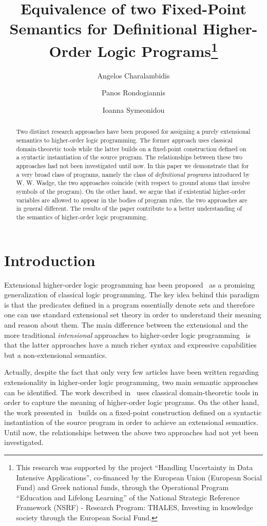 \documentclass[submission,copyright]{eptcs}
\title{Equivalence of two Fixed-Point Semantics for Definitional Higher-Order
Logic Programs\thanks{This research was supported by the project ``Handling Uncertainty in Data Intensive Applications'',
co-financed by the European Union (European Social Fund) and Greek national funds,
through the Operational Program ``Education and Lifelong Learning'' of the National
Strategic Reference Framework (NSRF) - Research Program: THALES, Investing in
knowledge society through the European Social Fund.}}
\author{Angelos Charalambidis
\institute{University of Athens \\ Athens, Greece}
\email{a.charalambidis@di.uoa.gr}
\and
Panos Rondogiannis
\institute{University of Athens \\ Athens, Greece}
\email{prondo@di.uoa.gr}
\and
Ioanna Symeonidou
\institute{University of Athens \\ Athens, Greece}
\email{i.symeonidou@di.uoa.gr}
}
\theoremstyle{definition}
\begin{document}
\maketitle

\begin{abstract}
Two distinct research approaches have been proposed for assigning a purely
  extensional semantics to higher-order logic programming. The former approach
  uses classical domain-theoretic tools while the latter builds on a fixed-point
  construction defined on a syntactic instantiation of the source program. The
  relationships between these two approaches had not been investigated until now.
  In this paper we demonstrate that for a very broad class of programs, namely
  the class of {\em definitional programs} introduced by W. W. Wadge, the two
  approaches coincide (with respect to ground atoms that involve symbols of the
  program). On the other hand, we argue that if existential higher-order
  variables are allowed to appear in the bodies of program rules, the two approaches
  are in general different. The results of the paper contribute to a better
  understanding of the semantics of higher-order logic programming.
\end{abstract}

\section{Introduction}
Extensional higher-order logic programming has been proposed~\cite{Wa91a,Bezem99,Bezem01,KRW05,CharalambidisHRW13,CharalambidisER14}
as a promising generalization of classical logic programming. The key idea behind this paradigm is
that the predicates defined in a program essentially denote sets and therefore one can use standard
extensional set theory in order to understand their meaning and reason about them. The main difference
between the extensional and the more traditional {\em intensional} approaches to higher-order logic 
programming~\cite{MN2012,CKW93-187} is that the latter approaches have a much richer syntax and 
expressive capabilities but a non-extensional semantics.

Actually, despite the fact that only very few articles have been written regarding extensionality in higher-order logic programming, two main semantic approaches can be identified. The work described in~\cite{Wa91a,KRW05,CharalambidisHRW13,CharalambidisER14}
uses classical domain-theoretic tools in order to capture the meaning of higher-order logic programs.
On the other hand, the work presented in~\cite{Bezem99,Bezem01} builds on a fixed-point
construction defined on a syntactic instantiation of the source program
in order to achieve an extensional semantics. Until now, the relationships between
the above two approaches had not yet been investigated.
\end{document}
